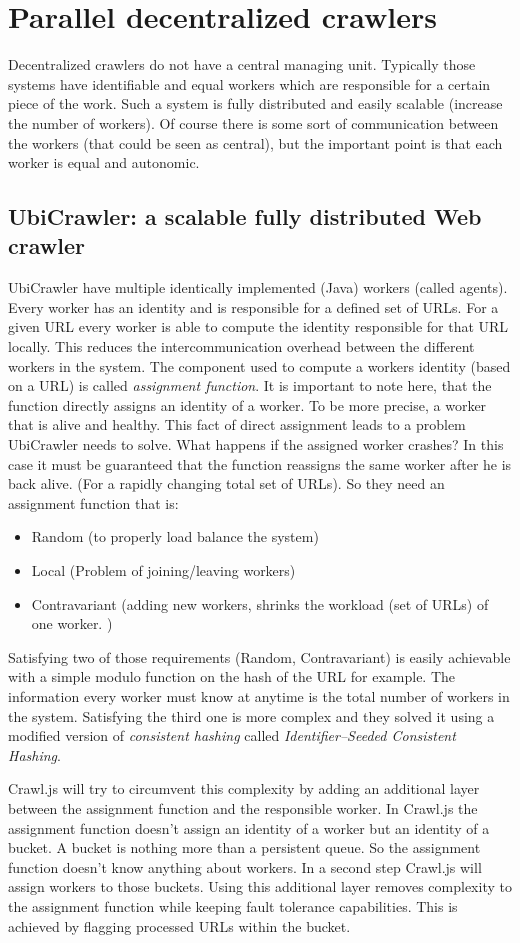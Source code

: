 \section{Parallel decentralized crawlers}
Decentralized crawlers do not have a central managing unit. Typically those systems have identifiable and equal workers which are responsible for a certain piece of the work. Such a system is fully distributed and easily scalable (increase the number of workers). Of course there is some sort of communication between the workers (that could be seen as central), but the important point is that each worker is equal and autonomic.

\subsection{UbiCrawler: a scalable fully distributed Web crawler \cite{ubicrawler}}
UbiCrawler have multiple identically implemented (Java) workers (called agents). Every worker has an identity and is responsible for a defined set of URLs. For a given URL every worker is able to compute the identity responsible for that URL locally. This reduces the intercommunication overhead between the different workers in the system. The component used to compute a workers identity (based on a URL) is called \emph{assignment function}. It is important to note here, that the function directly assigns an identity of a worker. To be more precise, a worker that is alive and healthy. This fact of direct assignment leads to a problem UbiCrawler needs to solve. What happens if the assigned worker crashes? In this case it must be guaranteed that the function reassigns the same worker after he is back alive. (For a rapidly changing total set of URLs). So they need an assignment function that is:
\begin{itemize}
\item Random (to properly load balance the system)
\item Local (Problem of joining/leaving workers)
\item Contravariant (adding new workers, shrinks the workload (set of URLs) of one worker. )
\end{itemize}
Satisfying two of those requirements (Random, Contravariant) is easily achievable with a simple modulo function on the hash of the URL for example. The information every worker must know at anytime is the total number of workers in the system. Satisfying the third one is more complex and they solved it using a modified version of \emph{consistent hashing} called \emph{Identifier–Seeded Consistent Hashing}. 

Crawl.js will try to circumvent this complexity by adding an additional layer between the assignment function and the responsible worker. In Crawl.js the assignment function doesn't assign an identity of a worker but an identity of a bucket. A bucket is nothing more than a persistent queue. So the assignment function doesn't know anything about workers. In a second step Crawl.js will assign workers to those buckets. Using this additional layer removes complexity to the assignment function while keeping fault tolerance capabilities. This is achieved by flagging processed URLs within the bucket.
